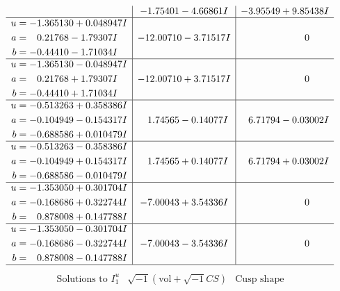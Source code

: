 \documentclass[1p]{elsarticle_modified}
\theoremstyle{definition}
\newcommand{\I}{\sqrt{-1}}
\begin{document}
$$\begin{array}{c|c|c}
 & -1.75401 - 4.66861 I & -3.95549 + 9.85438 I \\ \hline\begin{aligned}
u &= -1.365130 + 0.048947 I \\
a &= \phantom{-}0.21768 - 1.79307 I \\
b &= -0.44410 - 1.71034 I\end{aligned}
 & -12.00710 - 3.71517 I & \phantom{-0.000000 } 0 \\ \hline\begin{aligned}
u &= -1.365130 - 0.048947 I \\
a &= \phantom{-}0.21768 + 1.79307 I \\
b &= -0.44410 + 1.71034 I\end{aligned}
 & -12.00710 + 3.71517 I & \phantom{-0.000000 } 0 \\ \hline\begin{aligned}
u &= -0.513263 + 0.358386 I \\
a &= -0.104949 - 0.154317 I \\
b &= -0.688586 + 0.010479 I\end{aligned}
 & \phantom{-}1.74565 - 0.14077 I & \phantom{-}6.71794 - 0.03002 I \\ \hline\begin{aligned}
u &= -0.513263 - 0.358386 I \\
a &= -0.104949 + 0.154317 I \\
b &= -0.688586 - 0.010479 I\end{aligned}
 & \phantom{-}1.74565 + 0.14077 I & \phantom{-}6.71794 + 0.03002 I \\ \hline\begin{aligned}
u &= -1.353050 + 0.301704 I \\
a &= -0.168686 + 0.322744 I \\
b &= \phantom{-}0.878008 + 0.147788 I\end{aligned}
 & -7.00043 + 3.54336 I & \phantom{-0.000000 } 0 \\ \hline\begin{aligned}
u &= -1.353050 - 0.301704 I \\
a &= -0.168686 - 0.322744 I \\
b &= \phantom{-}0.878008 - 0.147788 I\end{aligned}
 & -7.00043 - 3.54336 I & \phantom{-0.000000 } 0\\
 \hline 
 \end{array}$$\newpage$$\begin{array}{c|c|c}  
\text{Solutions to }I^u_{1}& \I (\text{vol} + \sqrt{-1}CS) & \text{Cusp shape}\\

\end{array}$$
\end{document}
